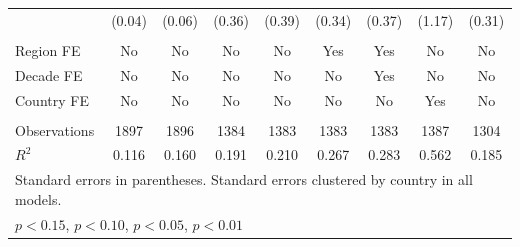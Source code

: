 \documentclass[12pt, letterpaper]{article}
\begin{document}
\begin{landscape}
\begin{table}[htbp]
\begin{footnotesize}
\begin{tabular}{l*{8}{c}}
                    &      (0.04)         &      (0.06)         &      (0.36)         &      (0.39)         &      (0.34)         &      (0.37)         &      (1.17)         &      (0.31)         \\
\\
Region FE         &         No                &           No              &               No          &      No                    &      Yes               & Yes                     &         No            &      No         \\
Decade FE             &         No                &           No              &               No          &      No                    &      No               & Yes                     &         No            &      No         \\
Country FE                   &         No                &           No              &               No          &      No                    &      No               & No                     &         Yes            &      No         \\
\\   
\hline               
Observations        &        1897         &        1896         &        1384         &        1383         &        1383         &        1383         &        1387         &        1304         \\
\(R^{2}\)           &       0.116         &       0.160         &       0.191         &       0.210         &       0.267         &       0.283         &       0.562         &       0.185         \\
\hline\hline
\multicolumn{9}{l}{\footnotesize Standard errors in parentheses. Standard errors clustered by country in all models.}\\
\multicolumn{9}{l}{\footnotesize \sym{+} \(p<0.15\), \sym{*} \(p<0.10\), \sym{**} \(p<0.05\), \sym{***} \(p<0.01\)}\\
\end{tabular}
\end{footnotesize}
\end{table}
\end{landscape}
\end{document}

